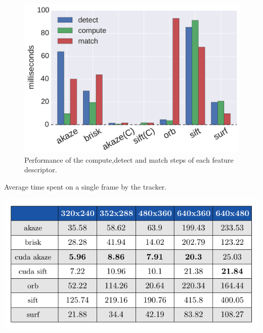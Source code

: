 \begin{figure}[b]
	\includegraphics[width=0.95\linewidth]{imgs/performances.pdf}
\vspace{-2.5mm}	
\caption{Performance of the compute,detect and match steps of each feature descriptor.}
\label{fig:speed}
\end{figure}

\begin{table}
\caption{Average time spent on a single frame by the tracker.}
	\includegraphics[width=0.95\linewidth]{tables/resolution_times.pdf}
\vspace{-2.5mm}	
\label{fig:fps}
\end{table}


